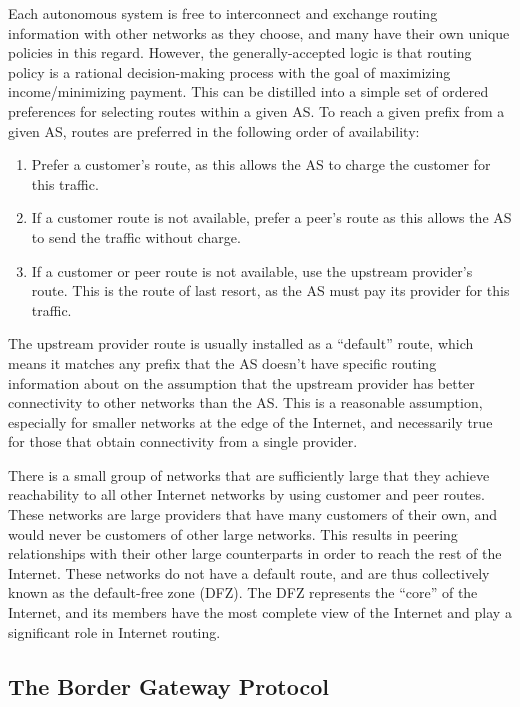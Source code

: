 Each autonomous system is free to interconnect and exchange routing information with other networks as they choose, and many have their own unique policies in this regard. However, the generally-accepted logic is that routing policy is a rational decision-making process with the goal of maximizing income/minimizing payment. This can be distilled into a simple set of ordered preferences for selecting routes within a given AS. To reach a given prefix from a given AS, routes are preferred in the following order of availability:

\begin{enumerate}
    \item{Prefer a customer's route, as this allows the AS to charge the customer for this traffic.}
    \item{If a customer route is not available, prefer a peer's route as this allows the AS to send the traffic without charge.}
    \item{If a customer or peer route is not available, use the upstream provider's route. This is the route of last resort, as the AS must pay its provider for this traffic.}
\end{enumerate}

The upstream provider route is usually installed as a ``default'' route, which means it matches any prefix that the AS doesn't have specific routing information about on the assumption that the upstream provider has better connectivity to other networks than the AS. This is a reasonable assumption, especially for smaller networks at the edge of the Internet, and necessarily true for those that obtain connectivity from a single provider.

There is a small group of networks that are sufficiently large that they achieve reachability to all other Internet networks by using customer and peer routes. These networks are large providers that have many customers of their own, and would never be customers of other large networks. This results in peering relationships with their other large counterparts in order to reach the rest of the Internet. These networks do not have a default route, and are thus collectively known as the default-free zone (DFZ). The DFZ represents the ``core'' of the Internet, and its members have the most complete view of the Internet and play a significant role in Internet routing.

\subsection{The Border Gateway Protocol}

